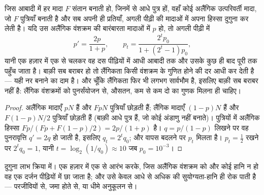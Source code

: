 \begin{theorem}[लैंगिकता का दुगुना दाम]\label{thm:b2:asexual-reproduction:twofold}
जिस आबादी में हर मादा $F$ संतान बनाती हो, जिनमें से आधे पुत्र हों, वहाँ
कोई अलैंगिक उत्परिवर्ती मादा, जो $F$ पुत्रियाँ बनाती है और सब अपनी ही
प्रतियाँ, अगली पीढ़ी की मादाओं में अपना हिस्सा दुगुना कर लेती है।
यदि उस अलैंगिक वंशक्रम की बारंबारता मादाओं में $p$ हो, तो अगली पीढ़ी में
\[
p' = \frac{2p}{1 + p}, \qquad p_t = \frac{2^t p_0}{1 + (2^t - 1)p_0},
\]
यानी एक हज़ार में एक से चलकर वह दस पीढ़ियों में आधी आबादी तक और उसके
कुछ ही बाद पूरी तक पहुँच जाता है। बाक़ी सब बराबर हो तो
लैंगिकता किसी वंशक्रम के गुणित होने की दर आधी कर देती है --- यही नर
बनाने का दाम है। और चूँकि लैंगिकता फिर भी लगभग सार्वभौम है, इसलिए बाक़ी
सब बराबर नहीं है: लैंगिक वंशक्रमों को पुनर्संयोजन से, औसतन, कम से कम दो
का गुणक मिलना ही चाहिए।
\end{theorem}
\begin{proof}
अलैंगिक मादाएँ $pN$ हैं और $FpN$ पुत्रियाँ छोड़ती हैं; लैंगिक
मादाएँ $(1 - p)N$ हैं और $F(1 - p)N/2$ पुत्रियाँ छोड़ती हैं (बाक़ी
आधे पुत्र हैं, जो कोई अंडाणु नहीं बनाते)। पुत्रियों में अलैंगिक हिस्सा
$Fp/(Fp + F(1 - p)/2) = 2p/(1 + p)$ है। $q = p/(1 -
p)$ लिखने पर वह पुनरावृत्ति $q' = 2q$ हो जाती है, इसलिए $q_t = 2^t q_0$;
और वापस बदलने पर $p_t$ मिलता है। $p_t = \tfrac12$ रखने पर $2^t q_0 = 1$, यानी
$t = \log_2(1/q_0) \approx 10$ जब $p_0 = 10^{-3}$।
\end{proof}

\begin{omfigure}

{\small दुगुना लाभ क्रिया में। एक हज़ार में एक से आरंभ करके, जिस
अलैंगिक वंशक्रम को और कोई हानि न हो वह एक दर्जन पीढ़ियों में छा जाता
है; और उसे केवल आधे से अधिक की सुयोग्यता-हानि ही रोक पाती है ---
परजीवियों से, जमा होते  से, या धीमे अनुकूलन से।}
\end{omfigure}

